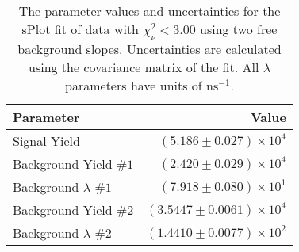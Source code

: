 
\begin{table}[ht]
    \begin{center}
        \begin{tabular}{lr}\toprule
            Parameter & Value \\\midrule
            Signal Yield & $(5.186 \pm 0.027) \times 10^{4}$ \\
            Background Yield $\#1$ & $(2.420 \pm 0.029) \times 10^{4}$ \\
            Background $\lambda$ $\#1$ & $(7.918 \pm 0.080) \times 10^{1}$ \\
            Background Yield $\#2$ & $(3.5447 \pm 0.0061) \times 10^{4}$ \\
            Background $\lambda$ $\#2$ & $(1.4410 \pm 0.0077) \times 10^{2}$ \\\bottomrule
        \end{tabular}
        \caption{The parameter values and uncertainties for the sPlot fit of data with $\chi^2_\nu < 3.00$ using two free background slopes. Uncertainties are calculated using the covariance matrix of the fit. All $\lambda$ parameters have units of $\si{\nano\second}^{-1}$.}\label{tab:splot-fit-results-chisqdof-3.00-free-2}
    \end{center}
\end{table}
